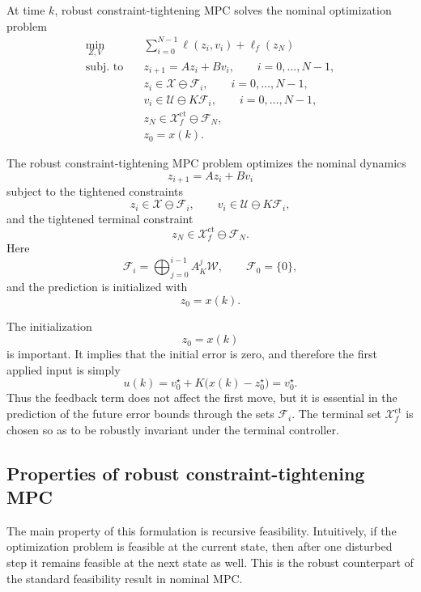 At time \(k\), robust constraint-tightening MPC solves the nominal optimization problem
\[
\begin{aligned}
    \min_{Z,V}\quad
    &
    \sum_{i=0}^{N-1}\ell(z_i,v_i)+\ell_f(z_N)
    \\
    \text{subj. to}\quad
    &
    z_{i+1}=Az_i+Bv_i,
    \qquad i=0,\ldots,N-1,
    \\
    &
    z_i\in\mathcal X\ominus \mathcal F_i,
    \qquad i=0,\ldots,N-1,
    \\
    &
    v_i\in\mathcal U\ominus K\mathcal F_i,
    \qquad i=0,\ldots,N-1,
    \\
    &
    z_N\in\mathcal X_f^{\mathrm{ct}}\ominus \mathcal F_N,
    \\
    &
    z_0=x(k).
\end{aligned}
\]

\begin{theorembox}
The robust constraint-tightening MPC problem optimizes the nominal dynamics
\[
    z_{i+1}=Az_i+Bv_i
\]
subject to the tightened constraints
\[
    z_i\in\mathcal X\ominus \mathcal F_i,
    \qquad
    v_i\in\mathcal U\ominus K\mathcal F_i,
\]
and the tightened terminal constraint
\[
    z_N\in\mathcal X_f^{\mathrm{ct}}\ominus \mathcal F_N.
\]
Here
\[
    \mathcal F_i=\bigoplus_{j=0}^{i-1}A_K^j\mathcal W,
    \qquad \mathcal F_0=\{0\},
\]
and the prediction is initialized with
\[
    z_0=x(k).
\]
\end{theorembox}

The initialization
\[
    z_0=x(k)
\]
is important. It implies that the initial error is zero, and therefore the first applied input is
simply
\[
    u(k)=v_0^\star+K\bigl(x(k)-z_0^\star\bigr)=v_0^\star.
\]
Thus the feedback term does not affect the first move, but it is essential in the prediction of the
future error bounds through the sets \(\mathcal F_i\). The terminal set
\(\mathcal X_f^{\mathrm{ct}}\) is chosen so as to be robustly invariant under the terminal
controller.

\subsection{Properties of robust constraint-tightening MPC}

The main property of this formulation is recursive feasibility. Intuitively, if the optimization
problem is feasible at the current state, then after one disturbed step it remains feasible at the
next state as well. This is the robust counterpart of the standard feasibility result in nominal
MPC.\\

